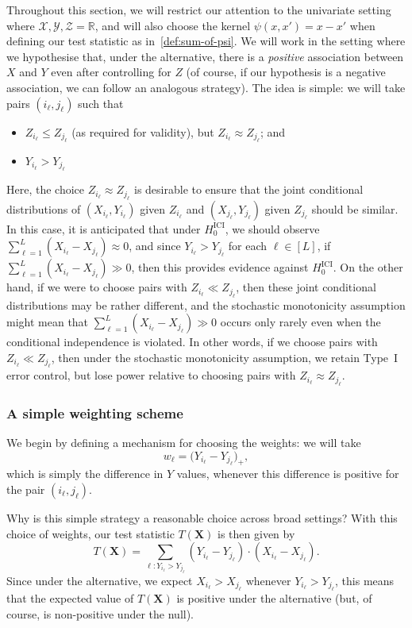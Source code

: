 \documentclass[12pt]{article}
\newcommand{\R}{\mathbb{R}}
\newcommand{\Zcal}{\mathcal{Z}}
\newcommand{\bX}{\mathbf{X}}
\begin{document}
Throughout this section, we will restrict our attention to the univariate setting where $\mathcal{X}, \mathcal{Y}, \Zcal = \R$, and will also choose the kernel $\psi(x,x') = x-x'$ when defining our test statistic as in~\eqref{def:sum-of-psi}. We will work in the setting where we hypothesise that, under the alternative, there is a \emph{positive} association between $X$ and $Y$ even after controlling for $Z$ (of course, if our hypothesis is a negative association, we can follow an analogous strategy). The idea is simple: we will take pairs $(i_\ell,j_\ell)$ such that
\begin{itemize}
    \item $Z_{i_\ell} \leq Z_{j_\ell}$ (as required for validity), but $Z_{i_\ell} \approx Z_{j_\ell}$; and
    \item $Y_{i_\ell} > Y_{j_\ell}$ 
\end{itemize}
 Here, the choice $Z_{i_\ell} \approx Z_{j_\ell}$ is desirable to ensure that the joint conditional distributions of $(X_{i_\ell},Y_{i_\ell})$ given $Z_{i_\ell}$ and $(X_{j_\ell},Y_{j_\ell})$ given $Z_{j_\ell}$ should be similar.  In this case, it is anticipated that under $H_0^{\mathrm{ICI}}$, we should observe $\sum_{\ell=1}^L (X_{i_\ell} - X_{j_\ell}) \approx 0$, and since $Y_{i_\ell} > Y_{j_\ell}$ for each $\ell \in [L]$, if $\sum_{\ell=1}^L (X_{i_\ell} - X_{j_\ell}) \gg 0$, then this provides evidence against $H_0^{\mathrm{ICI}}$.  On the other hand, if we were to choose pairs with $Z_{i_\ell} \ll Z_{j_\ell}$, then these joint conditional distributions may be rather different, and the stochastic monotonicity assumption might mean that $\sum_{\ell=1}^L (X_{i_\ell} - X_{j_\ell}) \gg 0$ occurs only rarely even when the conditional independence is violated.  In other words, if we choose pairs with $Z_{i_\ell} \ll Z_{j_\ell}$, then under the stochastic monotonicity assumption, we retain Type~I error control, but lose power relative to choosing pairs with $Z_{i_\ell} \approx Z_{j_\ell}$.
\subsubsection{A simple weighting scheme}\label{sec:simple_matching}
We begin by defining a mechanism for choosing the weights: we will take
\[
w_\ell = \big(Y_{i_\ell} - Y_{j_\ell}\big)_+,
\]
which is simply the difference in $Y$ values, whenever this difference is positive for the pair $(i_\ell,j_\ell)$.

Why is this simple strategy a reasonable choice across broad settings? With this choice of weights, our test statistic $T(\bX)$ is then given by
\[
T(\bX) = \sum_{\ell : Y_{i_\ell} > Y_{j_\ell}}  (Y_{i_\ell} - Y_{j_\ell}) \cdot (X_{i_\ell} - X_{j_\ell} ).
\]
Since under the alternative, we expect $X_{i_\ell} > X_{j_\ell}$ whenever $Y_{i_\ell}>Y_{j_\ell}$, this means that the expected value of $T(\bX)$ is positive under the alternative (but, of course, is non-positive under the null).
\end{document}
